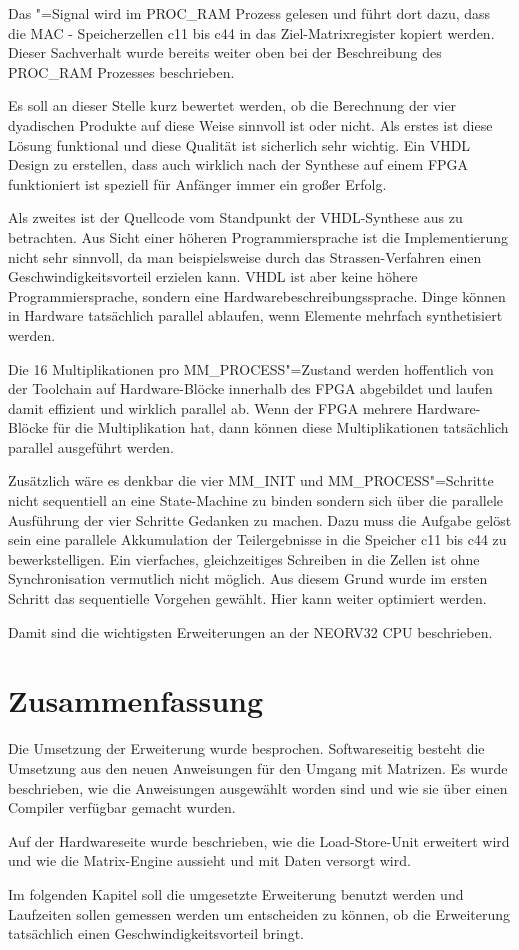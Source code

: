 Das \grqq{}"=Signal wird im PROC\_RAM Prozess gelesen und führt dort dazu, dass die MAC - Speicherzellen c11 bis c44 in das Ziel-Matrixregister kopiert werden. Dieser Sachverhalt wurde bereits weiter oben bei der Beschreibung des PROC\_RAM Prozesses beschrieben.

Es soll an dieser Stelle kurz bewertet werden, ob die Berechnung der vier dyadischen Produkte auf diese Weise sinnvoll ist oder nicht. Als erstes ist diese Lösung funktional und diese Qualität ist sicherlich sehr wichtig. Ein VHDL Design zu erstellen, dass auch wirklich nach der Synthese auf einem FPGA funktioniert ist speziell für Anfänger immer ein großer Erfolg.

Als zweites ist der Quellcode vom Standpunkt der VHDL-Synthese aus zu betrachten. Aus Sicht einer höheren Programmiersprache ist die Implementierung nicht sehr sinnvoll, da man beispielsweise durch das Strassen-Verfahren einen Geschwindigkeitsvorteil erzielen kann. VHDL ist aber keine höhere Programmiersprache, sondern eine Hardwarebeschreibungssprache. Dinge können in Hardware tatsächlich parallel ablaufen, wenn Elemente mehrfach synthetisiert werden.

Die 16 Multiplikationen pro MM\_PROCESS"=Zustand werden hoffentlich von der Toolchain auf Hardware-Blöcke innerhalb des FPGA abgebildet und laufen damit effizient und wirklich parallel ab. Wenn der FPGA mehrere Hardware-Blöcke für die Multiplikation hat, dann können diese Multiplikationen tatsächlich parallel ausgeführt werden.

Zusätzlich wäre es denkbar die vier MM\_INIT und MM\_PROCESS"=Schritte nicht sequentiell an eine State-Machine zu binden sondern sich über die parallele Ausführung der vier Schritte Gedanken zu machen. Dazu muss die Aufgabe gelöst sein eine parallele Akkumulation der Teilergebnisse in die Speicher c11 bis c44 zu bewerkstelligen. Ein vierfaches, gleichzeitiges Schreiben in die Zellen ist ohne Synchronisation vermutlich nicht möglich. Aus diesem Grund wurde im ersten Schritt das sequentielle Vorgehen gewählt. Hier kann weiter optimiert werden.

Damit sind die wichtigsten Erweiterungen an der NEORV32 CPU beschrieben.




\section{Zusammenfassung} \label{sec:extension_theory}

Die Umsetzung der Erweiterung wurde besprochen. Softwareseitig besteht die Umsetzung aus den neuen Anweisungen für den Umgang mit Matrizen. Es wurde beschrieben, wie die Anweisungen ausgewählt worden sind und wie sie über einen Compiler verfügbar gemacht wurden.

Auf der Hardwareseite wurde beschrieben, wie die Load-Store-Unit erweitert wird und wie die Matrix-Engine aussieht und mit Daten versorgt wird.

Im folgenden Kapitel soll die umgesetzte Erweiterung benutzt werden und Laufzeiten sollen gemessen werden um entscheiden zu können, ob die Erweiterung tatsächlich einen Geschwindigkeitsvorteil bringt.